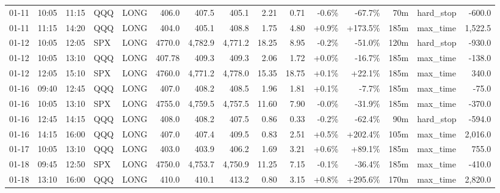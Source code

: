 \documentclass[11pt,a4paper,twoside]{article}
\begin{document}
\begin{landscape}
\begin{center}
\begin{longtable}{>{\color{txtmain}}l l l l l r r r r r r r r >{\color{txtmain}}l r}
01-11 & 10:05 & 11:15 & QQQ & LONG & 406.0 & 407.5 & 405.1 & 2.21 & 0.71 & \textcolor{lossred}{-0.6\%} & \textcolor{lossred}{-67.7\%} & 70m & hard\_stop & \textcolor{lossred}{-600.0} \\
01-11 & 11:15 & 14:20 & QQQ & LONG & 404.0 & 405.1 & 408.8 & 1.75 & 4.80 & \textcolor{wingreen}{+0.9\%} & \textcolor{wingreen}{+173.5\%} & 185m & max\_time & \textcolor{wingreen}{1,522.5} \\
01-12 & 10:05 & 12:05 & SPX & LONG & 4770.0 & 4,782.9 & 4,771.2 & 18.25 & 8.95 & \textcolor{lossred}{-0.2\%} & \textcolor{lossred}{-51.0\%} & 120m & hard\_stop & \textcolor{lossred}{-930.0} \\
01-12 & 10:05 & 13:10 & QQQ & LONG & 407.78 & 409.3 & 409.3 & 2.06 & 1.72 & \textcolor{wingreen}{+0.0\%} & \textcolor{lossred}{-16.7\%} & 185m & max\_time & \textcolor{lossred}{-138.0} \\
01-12 & 12:05 & 15:10 & SPX & LONG & 4760.0 & 4,771.2 & 4,778.0 & 15.35 & 18.75 & \textcolor{wingreen}{+0.1\%} & \textcolor{wingreen}{+22.1\%} & 185m & max\_time & \textcolor{wingreen}{340.0} \\
01-16 & 09:40 & 12:45 & QQQ & LONG & 407.0 & 408.2 & 408.5 & 1.96 & 1.81 & \textcolor{wingreen}{+0.1\%} & \textcolor{lossred}{-7.7\%} & 185m & max\_time & \textcolor{lossred}{-75.0} \\
01-16 & 10:05 & 13:10 & SPX & LONG & 4755.0 & 4,759.5 & 4,757.5 & 11.60 & 7.90 & \textcolor{lossred}{-0.0\%} & \textcolor{lossred}{-31.9\%} & 185m & max\_time & \textcolor{lossred}{-370.0} \\
01-16 & 12:45 & 14:15 & QQQ & LONG & 408.0 & 408.2 & 407.5 & 0.86 & 0.33 & \textcolor{lossred}{-0.2\%} & \textcolor{lossred}{-62.4\%} & 90m & hard\_stop & \textcolor{lossred}{-594.0} \\
01-16 & 14:15 & 16:00 & QQQ & LONG & 407.0 & 407.4 & 409.5 & 0.83 & 2.51 & \textcolor{wingreen}{+0.5\%} & \textcolor{wingreen}{+202.4\%} & 105m & max\_time & \textcolor{wingreen}{2,016.0} \\
01-17 & 10:05 & 13:10 & QQQ & LONG & 403.0 & 403.9 & 406.2 & 1.69 & 3.21 & \textcolor{wingreen}{+0.6\%} & \textcolor{wingreen}{+89.1\%} & 185m & max\_time & \textcolor{wingreen}{755.0} \\
01-18 & 09:45 & 12:50 & SPX & LONG & 4750.0 & 4,753.7 & 4,750.9 & 11.25 & 7.15 & \textcolor{lossred}{-0.1\%} & \textcolor{lossred}{-36.4\%} & 185m & max\_time & \textcolor{lossred}{-410.0} \\
01-18 & 13:10 & 16:00 & QQQ & LONG & 410.0 & 410.1 & 413.2 & 0.80 & 3.15 & \textcolor{wingreen}{+0.8\%} & \textcolor{wingreen}{+295.6\%} & 170m & max\_time & \textcolor{wingreen}{2,820.0} \\

\end{longtable}
\end{center}
\end{landscape}
\end{document}
